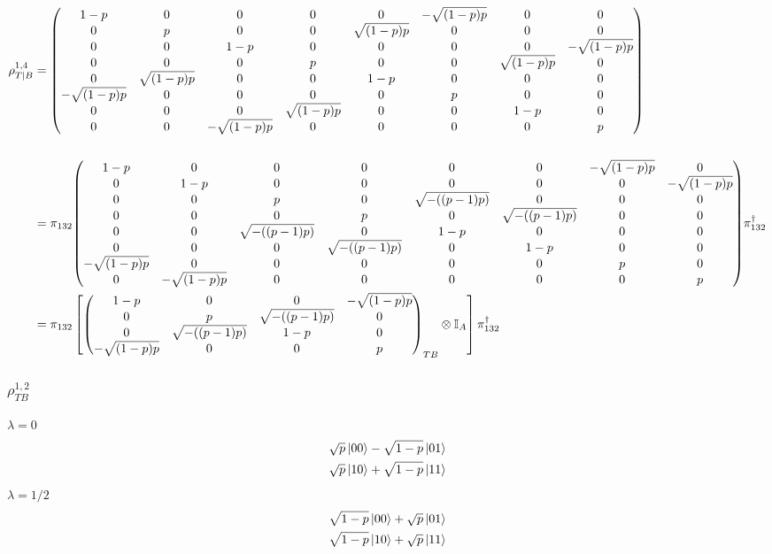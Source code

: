 \documentclass[12pt]{article}
\begin{document}
{\scriptsize
\begin{align*}
    \rho_{T|B}^{1,4} &= \mqty(
    1-p & 0 & 0 & 0 & 0 & -\sqrt{(1-p) p} & 0 & 0 \\
    0 & p & 0 & 0 & \sqrt{(1-p)p} & 0 & 0 & 0 \\
    0 & 0 & 1-p & 0 & 0 & 0 & 0 & -\sqrt{(1-p) p} \\
    0 & 0 & 0 & p & 0 & 0 & \sqrt{(1-p)p} & 0 \\
    0 & \sqrt{(1-p)p} & 0 & 0 & 1-p & 0 & 0 & 0 \\
    -\sqrt{(1-p) p} & 0 & 0 & 0 & 0 & p & 0 & 0 \\
    0 & 0 & 0 & \sqrt{(1-p)p} & 0 & 0 & 1-p & 0 \\
    0 & 0 & -\sqrt{(1-p) p} & 0 & 0 & 0 & 0 & p
) \\
\\
&= \pi_{132}\mqty(1-p&0&0&0&0&0&-\sqrt{(1-p)p}&0\\0&1-p&0&0&0&0&0&-\sqrt{(1-p)p}\\0&0&p&0&\sqrt{-((p-1)p)}&0&0&0\\0&0&0&p&0&\sqrt{-((p-1)p)}&0&0\\0&0&\sqrt{-((p-1)p)}&0&1-p&0&0&0\\0&0&0&\sqrt{-((p-1)p)}&0&1-p&0&0\\-\sqrt{(1-p)p}&0&0&0&0&0&p&0\\0&-\sqrt{(1-p)p}&0&0&0&0&0&p)\pi_{132}^\dag \\
&= \pi_{132}\left[\mqty(1-p&0&0&-\sqrt{(1-p)p}\\0&p&\sqrt{-((p-1)p)}&0\\0&\sqrt{-((p-1)p)}&1-p&0\\-\sqrt{(1-p)p}&0&0&p)_{TB}\otimes\mathbb{I}_A\right] \pi_{132}^\dag
\end{align*}
}

\subsubsection*{$\rho_{TB}^{1,2}$}
$\lambda = 0$
\begin{align*}
    \sqrt{p}\ket{00} - \sqrt{1-p}\ket{01} \\
    \sqrt{p}\ket{10} + \sqrt{1-p}\ket{11} 
\end{align*}
$\lambda = 1/2$
\begin{align*}
    \sqrt{1-p}\ket{00} + \sqrt{p}\ket{01} \\
    \sqrt{1-p}\ket{10} + \sqrt{p}\ket{11}
\end{align*}
\end{document}
